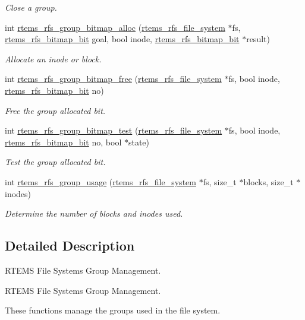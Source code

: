 \begin{DoxyCompactItemize}
\begin{DoxyCompactList}\small\item\em Close a group. \end{DoxyCompactList}\item 
int \mbox{\hyperlink{group__rtems__rfs_ga41c38f1d939cf04cad27dde05f52c394}{rtems\+\_\+rfs\+\_\+group\+\_\+bitmap\+\_\+alloc}} (\mbox{\hyperlink{struct__rtems__rfs__file__system}{rtems\+\_\+rfs\+\_\+file\+\_\+system}} $\ast$fs, \mbox{\hyperlink{rtems-rfs-bitmaps_8h_acc1b0aefe1b090890ccbc1b05279a78e}{rtems\+\_\+rfs\+\_\+bitmap\+\_\+bit}} goal, bool inode, \mbox{\hyperlink{rtems-rfs-bitmaps_8h_acc1b0aefe1b090890ccbc1b05279a78e}{rtems\+\_\+rfs\+\_\+bitmap\+\_\+bit}} $\ast$result)
\begin{DoxyCompactList}\small\item\em Allocate an inode or block. \end{DoxyCompactList}\item 
int \mbox{\hyperlink{group__rtems__rfs_ga00a3fb9f49f96fbef91adf13ae1622b7}{rtems\+\_\+rfs\+\_\+group\+\_\+bitmap\+\_\+free}} (\mbox{\hyperlink{struct__rtems__rfs__file__system}{rtems\+\_\+rfs\+\_\+file\+\_\+system}} $\ast$fs, bool inode, \mbox{\hyperlink{rtems-rfs-bitmaps_8h_acc1b0aefe1b090890ccbc1b05279a78e}{rtems\+\_\+rfs\+\_\+bitmap\+\_\+bit}} no)
\begin{DoxyCompactList}\small\item\em Free the group allocated bit. \end{DoxyCompactList}\item 
int \mbox{\hyperlink{group__rtems__rfs_ga5d4dab0178595df6610b29601dd67a01}{rtems\+\_\+rfs\+\_\+group\+\_\+bitmap\+\_\+test}} (\mbox{\hyperlink{struct__rtems__rfs__file__system}{rtems\+\_\+rfs\+\_\+file\+\_\+system}} $\ast$fs, bool inode, \mbox{\hyperlink{rtems-rfs-bitmaps_8h_acc1b0aefe1b090890ccbc1b05279a78e}{rtems\+\_\+rfs\+\_\+bitmap\+\_\+bit}} no, bool $\ast$state)
\begin{DoxyCompactList}\small\item\em Test the group allocated bit. \end{DoxyCompactList}\item 
int \mbox{\hyperlink{group__rtems__rfs_ga6f33253a6d629c7c2300b82fb21c4558}{rtems\+\_\+rfs\+\_\+group\+\_\+usage}} (\mbox{\hyperlink{struct__rtems__rfs__file__system}{rtems\+\_\+rfs\+\_\+file\+\_\+system}} $\ast$fs, size\+\_\+t $\ast$blocks, size\+\_\+t $\ast$inodes)
\begin{DoxyCompactList}\small\item\em Determine the number of blocks and inodes used. \end{DoxyCompactList}\end{DoxyCompactItemize}


\subsection{Detailed Description}
R\+T\+E\+MS File Systems Group Management. 

R\+T\+E\+MS File Systems Group Management.

These functions manage the groups used in the file system. 
